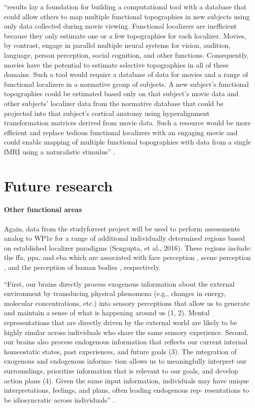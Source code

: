 ``results lay a foundation for building a computational tool with a database
that could allow others to map multiple functional topographies in new subjects
using only data collected during movie viewing. Functional localizers are
inefficient because they only estimate one or a few topographies for each
localizer. Movies, by contrast, engage in parallel multiple neural systems for
vision, audition, language, person perception, social cognition, and other
functions. Consequently, movies have the potential to estimate selective
topographies in all of these domains. Such a tool would require a database of
data for movies and a range of functional localizers in a normative group of
subjects. A new subject's functional topographies could be estimated based only
on that subject's movie data and other subjects’ localizer data from the
normative database that could be projected into that subject’s cortical anatomy
using hyperalignment transformation matrices derived from movie data. Such a
resource would be more efficient and replace tedious functional localizers with
an engaging movie and could enable mapping of multiple functional topographies
with data from a single fMRI using a naturalistic stimulus''
\citep{jiahui2020predicting}.


\section{Future research}

\paragraph{Other functional areas}

Again, data from the studyforrest project will be used to perform assessments
analog to WP1e for a range of additional individually determined regions based
on established localizer paradigms (Sengupta, et al., 2016).
%
These regions include: the \ac{ffa}, \ac{ppa}, and \ac{eba}  which are
associated with face perception \citep{kanwisher1997ffa,
pitcher2011occipitalfacearea}, scene perception \citep{epstein1998ppa}, and the
perception of human bodies \citep{downing2001bodyarea}, respectively.

``First, our brains directly process exogenous information about the external
environment by transducing physical phenomena (e.g., changes in energy,
molecular concentrations, etc.) into sensory perceptions that allow us to
generate and maintain a sense of what is happening around us (1, 2). Mental
representations that are directly driven by the external world are likely to be
highly similar across individuals who share the same sensory experience. Second,
our brains also process endogenous information that reflects our current
internal homeostatic states, past experiences, and future goals (3). The
integration of exogenous and endogenous informa- tion allows us to meaningfully
interpret our surroundings, prioritize information that is relevant to our
goals, and develop action plans (4). Given the same input information,
individuals may have unique interpretations, feelings, and plans, often leading
endogenous rep- resentations to be idiosyncratic across individuals''
\citep{chang2021endogenous}.

